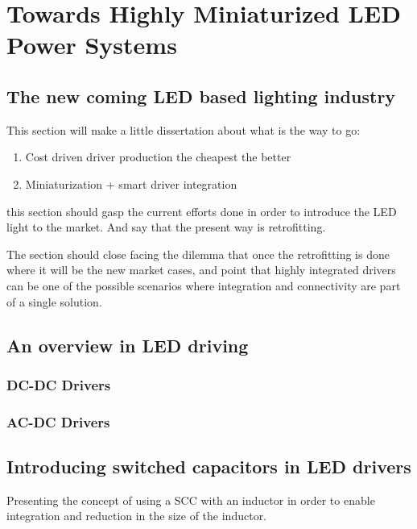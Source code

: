 \part{Towards Highly Miniaturized LED Power Systems }
\label{ch:twrd_HMLED}

\chapter{The new coming LED based lighting industry}
This section will make a little dissertation about what is the way to go:
\begin{enumerate}
  \item Cost driven driver production the cheapest the better
  \item Miniaturization + smart driver integration 
\end{enumerate}

this section should gasp the current efforts done in order to introduce the LED light to the market. And say that the present way is retrofitting.

The section should close facing the dilemma that once the retrofitting is done where it will be the new market cases, and point that highly integrated drivers
can be one of the possible scenarios where integration and connectivity are part of a single solution.

\chapter{An overview in LED driving}
\section{DC-DC Drivers}
\section{AC-DC Drivers}

\chapter{Introducing switched capacitors in LED drivers}
Presenting the concept of using a SCC with an inductor in order to enable integration and reduction in the size of the inductor.



